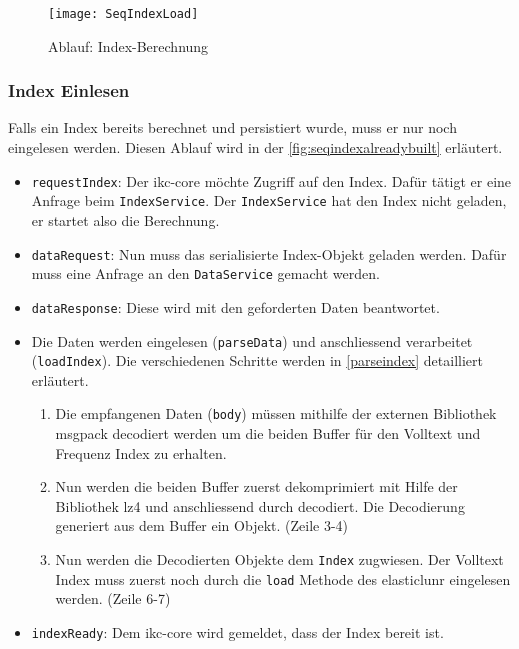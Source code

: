     \begin{figure}[H]
    \centering
    \texttt{[image: SeqIndexLoad]}
    \caption{Ablauf: Index-Berechnung}
    \label{fig:seqindexload}
    \end{figure}


    
    
\subsubsection{Index Einlesen}

Falls ein Index bereits berechnet und persistiert wurde, muss er nur noch eingelesen werden. Diesen Ablauf wird in der \autoref{fig:seqindexalreadybuilt} erläutert. 
\begin{itemize}
    \item \texttt{requestIndex}: Der \gls{ikc-core} möchte Zugriff auf den Index. Dafür tätigt er eine Anfrage beim \texttt{IndexService}. Der \texttt{IndexService} hat den Index nicht geladen, er startet also die Berechnung.
    \item \texttt{dataRequest}: Nun muss das serialisierte Index-Objekt geladen werden. Dafür muss eine Anfrage an den \texttt{DataService} gemacht werden.
    \item \texttt{dataResponse}: Diese wird mit den geforderten Daten beantwortet.
    \item Die Daten werden eingelesen (\texttt{parseData}) und anschliessend verarbeitet (\texttt{loadIndex}). Die verschiedenen Schritte werden in \autoref{parseindex} detailliert erläutert.
    \begin{enumerate}
        \item Die empfangenen Daten (\texttt{body}) müssen mithilfe der externen Bibliothek \gls{msgpack} decodiert werden um die beiden Buffer für den Volltext und Frequenz Index zu erhalten.
        \item Nun werden die beiden Buffer zuerst dekomprimiert mit Hilfe der Bibliothek \gls{lz4} und anschliessend durch decodiert. Die Decodierung generiert aus dem Buffer ein Objekt. (Zeile 3-4)
        \item Nun werden die Decodierten Objekte dem \texttt{Index} zugwiesen. Der Volltext Index muss zuerst noch durch die \texttt{load} Methode des \gls{elasticlunr} eingelesen werden. (Zeile 6-7)
    \end{enumerate}
    \item \texttt{indexReady}: Dem \gls{ikc-core} wird gemeldet, dass der Index bereit ist.
\end{itemize}

